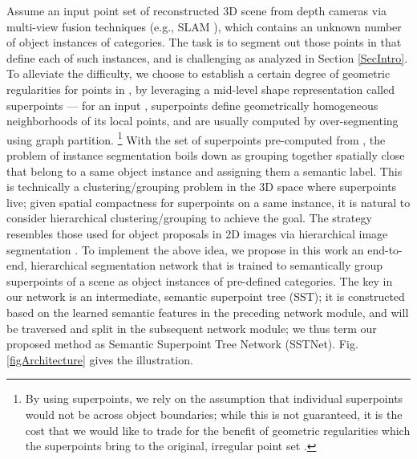 \documentclass[10pt,twocolumn,letterpaper]{article}
\begin{document}
Assume an input point set  of reconstructed 3D scene from depth cameras via multi-view fusion techniques (e.g., SLAM \cite{dai2017bundlefusion, Han2018FlashFusionRG}), 
which contains an unknown number of object instances of  categories. The task is to segment out those points in  that define each of such instances, and is challenging as analyzed in Section \ref{SecIntro}.
To alleviate the difficulty, we choose to establish a certain degree of geometric regularities for points in , by leveraging a mid-level shape representation called superpoints \cite{landrieu2018large,landrieu2019point} --- for an input , superpoints define geometrically homogeneous neighborhoods of its local points, and are usually computed by over-segmenting  using graph partition. \footnote{By using superpoints, we rely on the assumption that individual superpoints would not be across object boundaries; while this is not guaranteed, it is the cost that we would like to trade for the benefit of geometric regularities which the superpoints bring to the original, irregular point set .} With the set of superpoints   pre-computed from , the problem of instance segmentation boils down as grouping together spatially close  that belong to a same object instance and assigning them a semantic label.
This is technically a clustering/grouping problem in the 3D space where superpoints live; given spatial compactness for superpoints on a same instance, it is natural to consider hierarchical clustering/grouping to achieve the goal. The strategy resembles those used for object proposals in 2D images via hierarchical image segmentation \cite{2019Hierarchical, Ren_2013_CVPR, guimaraes2012hierarchical}. To implement the above idea, we propose in this work an end-to-end, hierarchical segmentation network that is trained to semantically group superpoints of a scene as object instances of pre-defined categories. The key in our network is an intermediate, semantic superpoint tree (SST); it is constructed based on the learned semantic features in the preceding network module, and will be traversed and split in the subsequent network module; we thus term our proposed method as Semantic Superpoint Tree Network (SSTNet). Fig. \ref{figArchitecture} gives the illustration.
\end{document}
